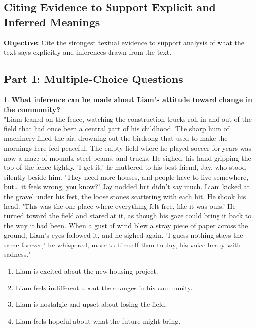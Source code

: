 \documentclass[12pt]{article}
\begin{document}
\subsection*{Citing Evidence to Support Explicit and Inferred Meanings}
\onehalfspacing

\begin{tcolorbox}[colframe=black!40, colback=gray!0, title=Learning Objective]
\textbf{Objective:} Cite the strongest textual evidence to support analysis of what the text says explicitly and inferences drawn from the text.
\end{tcolorbox}

\subsection*{Part 1: Multiple-Choice Questions}

1. \textbf{What inference can be made about Liam’s attitude toward change in the community?}\\
"Liam leaned on the fence, watching the construction trucks roll in and out of the field that had once been a central part of his childhood. The sharp hum of machinery filled the air, drowning out the birdsong that used to make the mornings here feel peaceful. The empty field where he played soccer for years was now a maze of mounds, steel beams, and trucks. He sighed, his hand gripping the top of the fence tightly. 'I get it,' he muttered to his best friend, Jay, who stood silently beside him. 'They need more houses, and people have to live somewhere, but… it feels wrong, you know?' Jay nodded but didn’t say much. Liam kicked at the gravel under his feet, the loose stones scattering with each hit. He shook his head. 'This was the one place where everything felt free, like it was ours.' He turned toward the field and stared at it, as though his gaze could bring it back to the way it had been. When a gust of wind blew a stray piece of paper across the ground, Liam’s eyes followed it, and he sighed again. 'I guess nothing stays the same forever,' he whispered, more to himself than to Jay, his voice heavy with sadness."  
\begin{enumerate}[label=\Alph*.]
    \item Liam is excited about the new housing project.  
    \item Liam feels indifferent about the changes in his community.  
    \item Liam is nostalgic and upset about losing the field.  
    \item Liam feels hopeful about what the future might bring.  
\end{enumerate}
\end{document}
